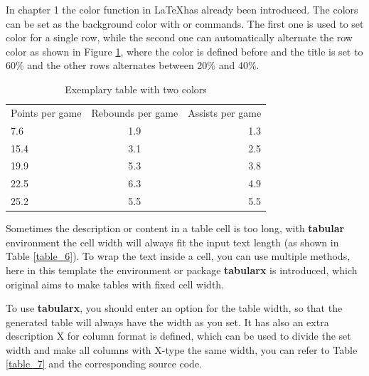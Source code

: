 	In chapter 1 the color function in \LaTeX has already been introduced. The colors can be set as the background color with {\color{blue}{\verb|\rowcolor|}} or {\color{blue}{\verb|\rowcolors|}} commands. The first one is used to set color for a single row, while the second one can automatically alternate the row color as shown in Figure \ref{table_5}, where the color is defined before and the title is set to 60\% and the other rows alternates between 20\% and 40\%.
	
	
	\begin{table}[h!]
		\centering
		\begin{tabular}{ l  c  r }
			\rowcolor{new-color!60}
			Points per game & Rebounds per game & Assists per game \\ 
			7.6  & 1.9 & 1.3 \\ 
			15.4 & 3.1 & 2.5 \\
			19.9 & 5.3 & 3.8 \\ 
			22.5 & 6.3 & 4.9 \\
			25.2 & 5.5 & 5.5 \\ 
		\end{tabular}
		\caption{Exemplary table with two colors}
		\label{table_5}
	\end{table}  

	Sometimes the description or content in a table cell is too long, with {\color{blue}\textbf{tabular}} environment the cell width will always fit the input text length (as shown in Table \ref{table_6}). To wrap the text inside a cell, you can use multiple methods, here in this template the environment or package {\color{blue}\textbf{tabularx}} is introduced, which original aims to make tables with fixed cell width.
	
	To use {\color{blue}\textbf{tabularx}}, you should enter an option for the table width, so that the generated table will always have the width as you set. It has also an extra description {\color{blue}X} for column format is defined, which can be used to divide the set width and make all columns with X-type the same width, you can refer to Table \ref{table_7} and the corresponding source code.
	
